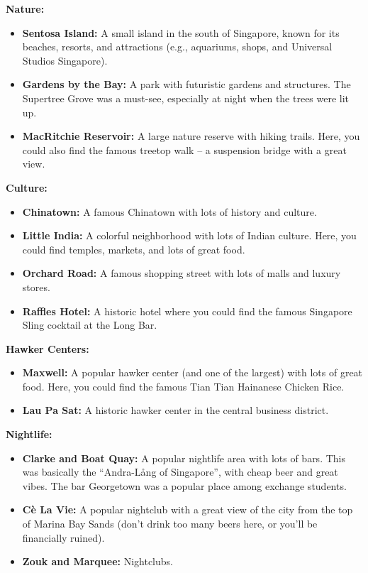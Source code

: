 \textbf{Nature:}
\vspace{-0.3cm}
\begin{itemize}
    \item \textbf{Sentosa Island:} A small island in the south of Singapore, known for its beaches, resorts, and attractions (e.g., aquariums, shops, and Universal Studios Singapore).
    \item \textbf{Gardens by the Bay:} A park with futuristic gardens and structures. The Supertree Grove was a must-see, especially at night when the trees were lit up.
    \item \textbf{MacRitchie Reservoir:} A large nature reserve with hiking trails. Here, you could also find the famous treetop walk -- a suspension bridge with a great view.
\end{itemize}
\vspace{-0.25cm}
\textbf{Culture:}
\vspace{-0.3cm}
\begin{itemize}
    \item \textbf{Chinatown:} A famous Chinatown with lots of history and culture.
    \item \textbf{Little India:} A colorful neighborhood with lots of Indian culture. Here, you could find temples, markets, and lots of great food.
    \item \textbf{Orchard Road:} A famous shopping street with lots of malls and luxury stores.
    \item \textbf{Raffles Hotel:} A historic hotel where you could find the famous Singapore Sling cocktail at the Long Bar.
\end{itemize}
\vspace{-0.25cm}
\textbf{Hawker Centers:}
\vspace{-0.3cm}
\begin{itemize}
    \item \textbf{Maxwell:} A popular hawker center (and one of the largest) with lots of great food. Here, you could find the famous Tian Tian Hainanese Chicken Rice.
    \item \textbf{Lau Pa Sat:} A historic hawker center in the central business district.
\end{itemize}
\vspace{-0.25cm}
\textbf{Nightlife:}
\vspace{-0.3cm}
\begin{itemize}
    \item \textbf{Clarke and Boat Quay:} A popular nightlife area with lots of bars. This was basically the ``Andra-Lång of Singapore'', with cheap beer and great vibes. The bar Georgetown was a popular place among exchange students.
    \item \textbf{Cè La Vie:} A popular nightclub with a great view of the city from the top of Marina Bay Sands (don't drink too many beers here, or you'll be financially ruined).
    \item \textbf{Zouk and Marquee:} Nightclubs.
\end{itemize}
